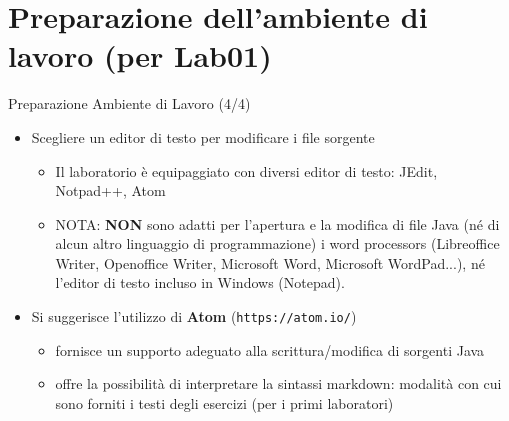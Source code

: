 \documentclass[presentation]{beamer}
\begin{document}
\section{Preparazione dell'ambiente di lavoro (per Lab01)}





\begin{frame}{Preparazione Ambiente di Lavoro (4/4)}
\begin{itemize}
\item Scegliere un editor di testo per modificare i file sorgente
\begin{itemize}
\item Il laboratorio è equipaggiato con diversi editor di testo: JEdit, Notpad++, Atom
\item NOTA: \textbf{NON} sono adatti per l'apertura e la modifica di file Java (né di alcun altro linguaggio di programmazione) i word processors (Libreoffice Writer, Openoffice Writer, Microsoft Word, Microsoft WordPad...), né l'editor di testo incluso in Windows (Notepad).
\end{itemize}
\vfill
\item Si suggerisce l'utilizzo di \textbf{Atom} (\texttt{https://atom.io/})
\begin{itemize}
\item fornisce un supporto adeguato alla scrittura/modifica di sorgenti Java
\item offre la possibilità di interpretare la sintassi markdown: modalità con cui sono forniti i testi degli esercizi (per i primi laboratori)
\end{itemize}
\end{itemize}
\end{frame}
\end{document}
